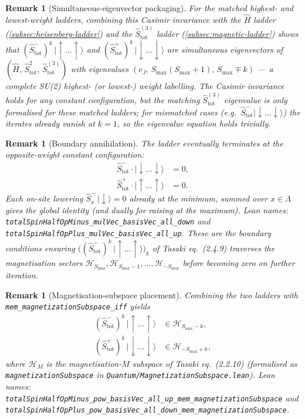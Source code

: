 \documentclass[a4paper,11pt]{article}
\newtheorem{remark}[theorem]{Remark}
\begin{document}
\begin{remark}[Simultaneous-eigenvector packaging]
For the matched highest- and lowest-weight ladders, combining this
Casimir invariance with the $\hat H$ ladder
(\ref{subsec:heisenberg-ladder}) and the $\hat S_{\mathrm{tot}}^{(3)}$
ladder (\ref{subsec:magnetic-ladder}) shows that
$(\hat S_{\mathrm{tot}}^{-})^{k}\,|{\uparrow}\dots{\uparrow}\rangle$
and $(\hat S_{\mathrm{tot}}^{+})^{k}\,|{\downarrow}\dots{\downarrow}\rangle$
are simultaneous eigenvectors of $(\hat H,\,\hat S_{\mathrm{tot}}^{2},\,
\hat S_{\mathrm{tot}}^{(3)})$ with eigenvalues
$(c_{J},\,S_{\max}(S_{\max}+1),\,S_{\max}\mp k)$ — a complete SU(2)
highest- (or lowest-) weight labelling.  The Casimir invariance holds
for any constant configuration, but the matching $\hat
S_{\mathrm{tot}}^{(3)}$ eigenvalue is only formalised for these
matched ladders; for mismatched cases (e.g.\ $\hat
S_{\mathrm{tot}}^{-}|{\downarrow}\dots{\downarrow}\rangle$) the
iterates already vanish at $k = 1$, so the eigenvalue equation holds
trivially.
\end{remark}

\begin{remark}[Boundary annihilation]
The ladder eventually terminates at the opposite-weight constant
configuration:
\begin{align*}
  \hat S_{\mathrm{tot}}^{-} \cdot
    |{\downarrow}\dots{\downarrow}\rangle &= 0,\\
  \hat S_{\mathrm{tot}}^{+} \cdot
    |{\uparrow}\dots{\uparrow}\rangle &= 0.
\end{align*}
Each on-site lowering $\hat S_{x}^{-}\,|{\downarrow}\rangle = 0$
already at the minimum, summed over $x \in \Lambda$ gives the global
identity (and dually for raising at the maximum).  Lean names:
\texttt{totalSpinHalfOpMinus\_mulVec\_basisVec\_all\_down} and
\texttt{totalSpinHalfOpPlus\_mulVec\_basisVec\_all\_up}.  These are
the boundary conditions ensuring $\bigl((\hat
S_{\mathrm{tot}}^{-})^{k}\,|{\uparrow}\dots{\uparrow}\rangle\bigr)_{k}$
of Tasaki eq.~(2.4.9) traverses the magnetisation sectors
$\mathcal H_{S_{\max}},\mathcal H_{S_{\max}-1},\dots,
\mathcal H_{-S_{\max}}$ before becoming zero on further iteration.
\end{remark}

\begin{remark}[Magnetisation-subspace placement]
Combining the two ladders with \texttt{mem\_magnetizationSubspace\_iff}
yields
\begin{align*}
  (\hat S_{\mathrm{tot}}^{-})^{k}\,|{\uparrow}\dots{\uparrow}\rangle
    &\in \mathcal H_{S_{\max} - k},\\
  (\hat S_{\mathrm{tot}}^{+})^{k}\,|{\downarrow}\dots{\downarrow}\rangle
    &\in \mathcal H_{-S_{\max} + k},
\end{align*}
where $\mathcal H_{M}$ is the magnetisation-$M$ subspace of Tasaki
eq.~(2.2.10) (formalised as \texttt{magnetizationSubspace} in
\texttt{Quantum/MagnetizationSubspace.lean}).  Lean names:
\texttt{totalSpinHalfOpMinus\_pow\_basisVec\_all\_up\_mem\_magnetizationSubspace}
and
\texttt{totalSpinHalfOpPlus\_pow\_basisVec\_all\_down\_mem\_magnetizationSubspace}.
\end{remark}
\end{document}
